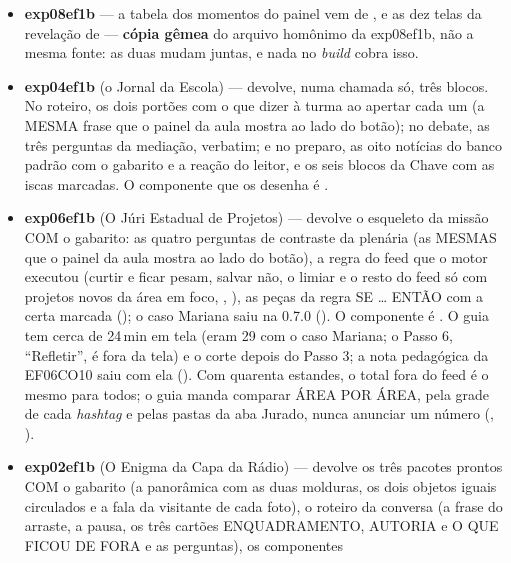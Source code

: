 \begin{itemize}
  \item \textbf{exp08ef1b} --- a tabela dos momentos do painel vem de
    , e as dez telas da revelação de
     --- \textbf{cópia gêmea} do arquivo
    homônimo da exp08ef1b, não a mesma fonte: as duas mudam juntas, e nada no
    \emph{build} cobra isso.
  \item \textbf{exp04ef1b} (o Jornal da Escola) ---
     devolve, numa chamada
    só, três blocos. No roteiro, os dois portões com o que dizer à turma ao apertar cada um (a MESMA frase que
    o painel da aula mostra ao lado do botão); no debate, as três perguntas da
    mediação, verbatim; e no preparo, as oito notícias do banco padrão com o
    gabarito e a reação do leitor, e os seis blocos da Chave com as iscas
    marcadas. O componente que os desenha é
    .
  \item \textbf{exp06ef1b} (O Júri Estadual de Projetos) ---
     devolve o esqueleto
    da missão COM o gabarito: as quatro perguntas de contraste da plenária (as
    MESMAS que o painel da aula mostra ao lado do botão), a regra do feed que o
    motor executou (curtir e ficar pesam, salvar não, o limiar e o resto do
    feed só com projetos novos da área em foco, ,
    ), as peças da regra SE \ldots{} ENTÃO com a certa marcada
    (); o caso Mariana saiu na 0.7.0 (). O
    componente é . O
    guia tem cerca de 24\,min em tela (eram 29 com o caso Mariana; o Passo 6,
    \enquote{Refletir}, é fora da tela) e o corte depois do Passo 3; a nota pedagógica da
    EF06CO10 saiu com ela (). Com quarenta estandes, o total fora do feed é o
    mesmo para todos; o guia manda comparar ÁREA POR ÁREA, pela grade de cada
    \emph{hashtag} e pelas pastas da aba Jurado, nunca anunciar um número
    (, ).
  \item \textbf{exp02ef1b} (O Enigma da Capa da Rádio) ---
     devolve os três pacotes
    prontos COM o gabarito (a panorâmica com as duas molduras, os dois objetos
    iguais circulados e a fala da visitante de cada foto), o roteiro da
    conversa (a frase do arraste, a pausa, os três cartões ENQUADRAMENTO,
    AUTORIA e O QUE FICOU DE FORA e as perguntas), os componentes

\end{itemize}
